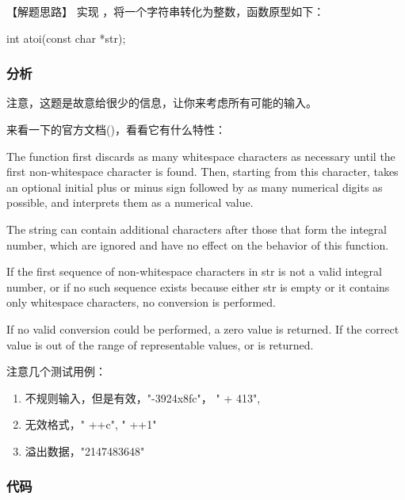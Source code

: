 【解题思路】
实现 ，将一个字符串转化为整数，函数原型如下：
\begin{Code}
int atoi(const char *str);
\end{Code}


\subsubsection{分析}
注意，这题是故意给很少的信息，让你来考虑所有可能的输入。

来看一下的官方文档()，看看它有什么特性：

The function first discards as many whitespace characters as necessary until the first non-whitespace character is found. Then, starting from this character, takes an optional initial plus or minus sign followed by as many numerical digits as possible, and interprets them as a numerical value.

The string can contain additional characters after those that form the integral number, which are ignored and have no effect on the behavior of this function.

If the first sequence of non-whitespace characters in str is not a valid integral number, or if no such sequence exists because either str is empty or it contains only whitespace characters, no conversion is performed.

If no valid conversion could be performed, a zero value is returned. If the correct value is out of the range of representable values,  or  is returned.

注意几个测试用例：
\begin{enumerate}
\item 不规则输入，但是有效，"-3924x8fc"， "  +  413",
\item 无效格式，" ++c", " ++1"
\item 溢出数据，"2147483648"
\end{enumerate}


\subsubsection{代码}

